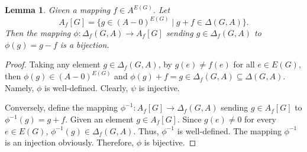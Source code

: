 \documentclass[12pt]{article}%
\numberwithin{equation}{section}
\newtheorem{lemma}[lemma]{Lemma}
\begin{document}
\begin{lemma}\label{Bijection}
Given a mapping $f\in A^{E(G)}$. Let 
\[
A_f[G]=\big\{g\in (A-0)^{E(G)}\mid g+f\in \Delta(G,A)\big\}.
\]
Then the mapping $\phi:\Delta_f(G,A)\to A_f[G]$ sending $g\in\Delta_f(G,A)$ to $\phi(g)=g-f$ is a bijection.
\end{lemma}
\begin{proof}
Taking any element $g\in\Delta_f(G,A)$, by $g(e)\ne f(e)$ for all $e\in E(G)$, then $\phi(g)\in (A-0)^{E(G)}$ and $\phi(g)+f=g\in \Delta_f(G,A)\subseteq \Delta(G,A)$. Namely, $\phi$ is well-defined. Clearly, $\psi$ is injective.

Conversely, define the mapping $\phi^{-1}:A_f[G]\to \Delta_f(G,A)$ sending $g\in A_f[G]$ to $\phi^{-1}(g)=g+f$. Given an element $g\in A_f[G]$. Since $g(e)\ne 0$ for every $e\in E(G)$, $\phi^{-1}(g)\in \Delta_f(G,A)$. Thus, $\phi^{-1}$ is well-defined. The mapping $\phi^{-1}$ is an injection obviously. Therefore, $\phi$ is bijective. 
\end{proof}
\end{document}
